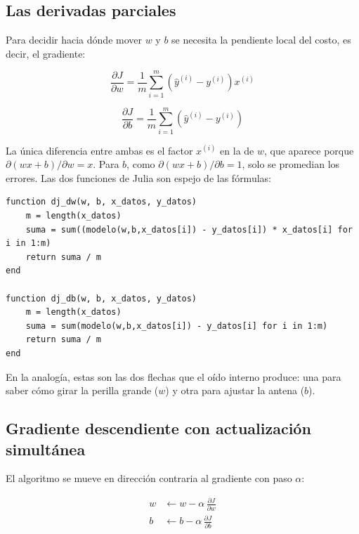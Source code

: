\documentclass[11pt,a4paper]{article}
\begin{document}
\subsection{Las derivadas parciales}

Para decidir hacia d\'onde mover $w$ y $b$ se necesita la pendiente local del costo, es decir, el gradiente:

\begin{equation}
  \frac{\partial J}{\partial w} = \frac{1}{m} \sum_{i=1}^{m} \left(\hat{y}^{(i)} - y^{(i)}\right) x^{(i)}
  \label{eq:djdw}
\end{equation}

\begin{equation}
  \frac{\partial J}{\partial b} = \frac{1}{m} \sum_{i=1}^{m} \left(\hat{y}^{(i)} - y^{(i)}\right)
  \label{eq:djdb}
\end{equation}

La \'unica diferencia entre ambas es el factor $x^{(i)}$ en la de $w$, que aparece porque $\partial(wx+b)/\partial w = x$. Para $b$, como $\partial(wx+b)/\partial b = 1$, solo se promedian los errores. Las dos funciones de Julia son espejo de las f\'ormulas:

\begin{lstlisting}
function dj_dw(w, b, x_datos, y_datos)
    m = length(x_datos)
    suma = sum((modelo(w,b,x_datos[i]) - y_datos[i]) * x_datos[i] for i in 1:m)
    return suma / m
end

function dj_db(w, b, x_datos, y_datos)
    m = length(x_datos)
    suma = sum(modelo(w,b,x_datos[i]) - y_datos[i] for i in 1:m)
    return suma / m
end
\end{lstlisting}

En la analog\'ia, estas son las dos flechas que el o\'ido interno produce: una para saber c\'omo girar la perilla grande ($w$) y otra para ajustar la antena ($b$).

\subsection{Gradiente descendiente con actualizaci\'on simult\'anea}

El algoritmo se mueve en direcci\'on contraria al gradiente con paso $\alpha$:

\begin{align}
  w &\leftarrow w - \alpha \, \frac{\partial J}{\partial w} \label{eq:upw}\\
  b &\leftarrow b - \alpha \, \frac{\partial J}{\partial b} \label{eq:upb}
\end{align}
\end{document}
